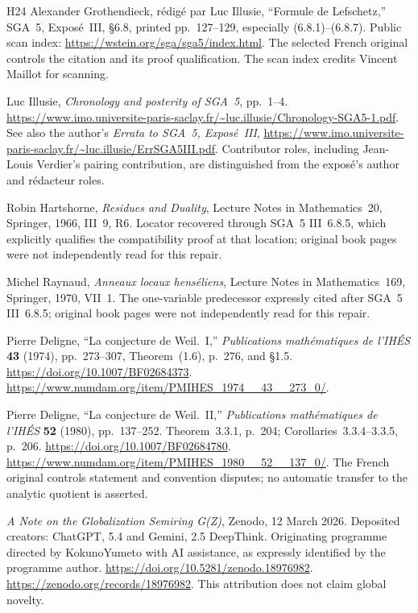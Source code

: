 \documentclass[11pt,a4paper]{article}
\begin{document}
\begin{thebibliography}{H24}
Alexander Grothendieck, r\'edig\'e par Luc Illusie,
``Formule de Lefschetz,'' SGA~5, Expos\'e~III,
\S6.8, printed pp.~127--129, especially (6.8.1)--(6.8.7).
Public scan index: \url{https://wstein.org/sga/sga5/index.html}.
The selected French original controls the citation and its proof
qualification. The scan index credits Vincent Maillot for scanning.

Luc Illusie, \emph{Chronology and posterity of SGA~5}, pp.~1--4.
\url{https://www.imo.universite-paris-saclay.fr/~luc.illusie/Chronology-SGA5-1.pdf}.
See also the author's \emph{Errata to SGA~5, Expos\'e~III},
\url{https://www.imo.universite-paris-saclay.fr/~luc.illusie/ErrSGA5III.pdf}.
Contributor roles, including Jean-Louis Verdier's pairing contribution,
are distinguished from the expos\'e's author and r\'edacteur roles.

Robin Hartshorne, \emph{Residues and Duality}, Lecture Notes in
Mathematics~20, Springer, 1966, III~9, R6.
Locator recovered through SGA~5 III~6.8.5, which explicitly qualifies
the compatibility proof at that location; original book pages were
not independently read for this repair.

Michel Raynaud, \emph{Anneaux locaux hens\'eliens}, Lecture Notes in
Mathematics~169, Springer, 1970, VII~1.
The one-variable predecessor expressly cited after SGA~5 III~6.8.5;
original book pages were not independently read for this repair.

Pierre Deligne, ``La conjecture de Weil.~I,''
\emph{Publications math\'ematiques de l'IH\'ES} \textbf{43} (1974),
pp.~273--307, Theorem~(1.6), p.~276, and \S1.5.
\url{https://doi.org/10.1007/BF02684373}.
\url{https://www.numdam.org/item/PMIHES_1974__43__273_0/}.

Pierre Deligne, ``La conjecture de Weil.~II,''
\emph{Publications math\'ematiques de l'IH\'ES} \textbf{52} (1980),
pp.~137--252. Theorem~3.3.1, p.~204; Corollaries~3.3.4--3.3.5, p.~206.
\url{https://doi.org/10.1007/BF02684780}.
\url{https://www.numdam.org/item/PMIHES_1980__52__137_0/}.
The French original controls statement and convention disputes;
no automatic transfer to the analytic quotient is asserted.

\emph{A Note on the Globalization Semiring G(Z)}, Zenodo,
12 March 2026. Deposited creators: ChatGPT, 5.4 and Gemini, 2.5 DeepThink.
Originating programme directed by KokunoYumeto with AI assistance,
as expressly identified by the programme author.
\url{https://doi.org/10.5281/zenodo.18976982}.
\url{https://zenodo.org/records/18976982}.
This attribution does not claim global novelty.


\end{thebibliography}
\end{document}

